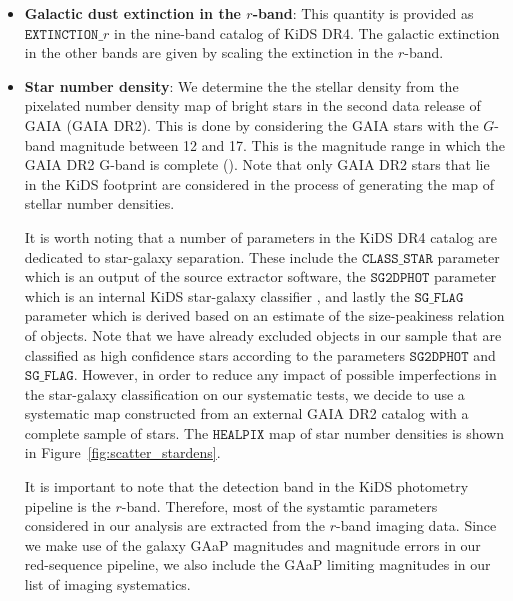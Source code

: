 \documentclass{aa}
\numberwithin{equation}{section}
\begin{document}
\begin{itemize}
  \item \textbf{Galactic dust extinction in the $r$-band}: This quantity is provided as $\mathtt{EXTINCTION}\_r$ in the nine-band catalog of KiDS DR4. The galactic extinction in the other bands are given by scaling the extinction in the $r$-band.   
  
  \item \textbf{Star number density}: We determine the the stellar density from the pixelated number density map of bright stars in the second data release of GAIA (GAIA DR2). This is done by considering the GAIA stars with the $G$-band magnitude between 12 and 17. This is the magnitude range in which the GAIA DR2 G-band is complete (\citealt{gaia0,gaia1}). Note that only GAIA DR2 stars that lie in the KiDS footprint are considered in the process of generating the map of stellar number densities. 
  
  It is worth noting that a number of parameters in the KiDS DR4 catalog are dedicated to star-galaxy separation. These include the $\mathtt{CLASS\_STAR}$
  parameter which is an output of the source extractor software, the $\mathtt{SG2DPHOT}$ parameter which is an internal KiDS star-galaxy classifier \citep[e.g.][]{kids_dr3, radovich2017}, and lastly the $\mathtt{SG\_FLAG}$ parameter which is derived based on an estimate of the size-peakiness relation of objects. Note that we have already excluded objects in our sample that are classified as high confidence stars according to the parameters $\mathtt{SG2DPHOT}$ and $\mathtt{SG\_FLAG}$. However, in order to reduce any impact of possible imperfections in the star-galaxy classification on our systematic tests, we decide to use a systematic map constructed from an external GAIA DR2 catalog with a complete sample of stars. The $\mathtt{HEALPIX}$ map of star number densities is shown in Figure~\ref{fig:scatter_stardens}.
 
  It is important to note that the detection band in the KiDS photometry pipeline is the $r$-band. Therefore, most of the systamtic parameters considered in our analysis are extracted from the $r$-band imaging data. Since we make use of the galaxy GAaP magnitudes and magnitude errors in our red-sequence pipeline, we also include the GAaP limiting magnitudes in our list of imaging systematics.  
 
\end{itemize}

\end{document}
